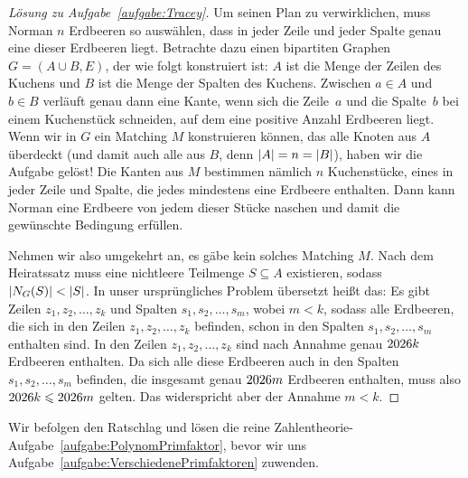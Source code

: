\begin{proof}[Lösung zu Aufgabe~\ref{aufgabe:Tracey}]
	Um seinen Plan zu verwirklichen, muss Norman $n$ Erdbeeren so auswählen, dass in jeder Zeile und jeder Spalte genau eine dieser Erdbeeren liegt. Betrachte dazu einen bipartiten Graphen $G=(A\cup B,E)$, der wie folgt konstruiert ist: $A$ ist die Menge der Zeilen des Kuchens und $B$ ist die Menge der Spalten des Kuchens. Zwischen $a\in A$ und $b\in B$ verläuft genau dann eine Kante, wenn sich die Zeile~$a$ und die Spalte~$b$ bei einem Kuchenstück schneiden, auf dem eine positive Anzahl Erdbeeren liegt. Wenn wir in $G$ ein Matching $M$ konstruieren können, das alle Knoten aus $A$ überdeckt (und damit auch alle aus $B$, denn $\lvert A\rvert=n=\lvert B\rvert$), haben wir die Aufgabe gelöst! Die Kanten aus $M$ bestimmen nämlich $n$ Kuchenstücke, eines in jeder Zeile und Spalte, die jedes mindestens eine Erdbeere enthalten. Dann kann Norman eine Erdbeere von jedem dieser Stücke naschen und damit die gewünschte Bedingung erfüllen.
	
	Nehmen wir also umgekehrt an, es gäbe kein solches Matching $M$. Nach dem Heiratssatz muss eine nichtleere Teilmenge $S\subseteq A$ existieren, sodass $\lvert N_G(S)\rvert<\lvert S\rvert$. In unser ursprüngliches Problem übersetzt heißt das: Es gibt Zeilen $z_1,z_2,\dotsc,z_k$ und Spalten $s_1,s_2,\dotsc,s_m$, wobei $m<k$, sodass alle Erdbeeren, die sich in den Zeilen $z_1,z_2,\dotsc,z_k$ befinden, schon in den Spalten $s_1,s_2,\dotsc,s_m$ enthalten sind. In den Zeilen $z_1,z_2,\dotsc,z_k$ sind nach Annahme genau $\the\year k$ Erdbeeren enthalten. Da sich alle diese Erdbeeren auch in den Spalten $s_1,s_2,\dotsc,s_m$ befinden, die insgesamt genau $\the\year m$ Erdbeeren enthalten, muss also $\the\year k\leqslant \the\year m$ gelten. Das widerspricht aber der Annahme $m<k$.
\end{proof}

Wir befolgen den Ratschlag und lösen die reine Zahlentheorie-Aufgabe~\ref{aufgabe:PolynomPrimfaktor}, bevor wir uns Aufgabe~\ref{aufgabe:VerschiedenePrimfaktoren} zuwenden.

